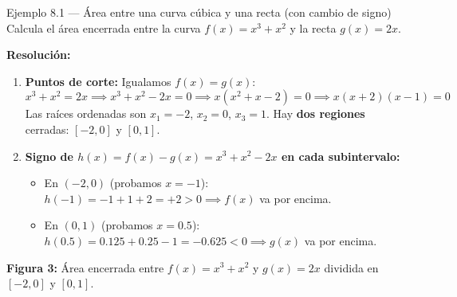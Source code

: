 \documentclass[10pt,a4paper]{article}
\begin{document}
\begin{ejemploboxlong}{Ejemplo 8.1 --- Área entre una curva cúbica y una recta (con cambio de signo)}
Calcula el área encerrada entre la curva $f(x) = x^3 + x^2$ y la recta $g(x) = 2x$.
\par\textbf{Resolución:}
\begin{enumerate}\itemsep 2pt
  \item \textbf{Puntos de corte:} Igualamos $f(x) = g(x)$:
  $$x^3 + x^2 = 2x \implies x^3 + x^2 - 2x = 0 \implies x(x^2 + x - 2) = 0 \implies x(x + 2)(x - 1) = 0$$
  Las raíces ordenadas son $x_1 = -2$, $x_2 = 0$, $x_3 = 1$. Hay \textbf{dos regiones} cerradas: $[-2, 0]$ y $[0, 1]$.
  \item \textbf{Signo de $h(x) = f(x) - g(x) = x^3 + x^2 - 2x$ en cada subintervalo:}
  \begin{itemize}\itemsep 1pt
    \item En $(-2, 0)$ (probamos $x=-1$): $h(-1) = -1 + 1 + 2 = +2 > 0 \implies f(x)$ va por encima.
    \item En $(0, 1)$ (probamos $x=0.5$): $h(0.5) = 0.125 + 0.25 - 1 = -0.625 < 0 \implies g(x)$ va por encima.
  \end{itemize}
\end{enumerate}

\begin{center}
\par\vspace{-3pt}
{\footnotesize \textbf{Figura 3:} Área encerrada entre $f(x)=x^3+x^2$ y $g(x)=2x$ dividida en $[-2, 0]$ y $[0, 1]$.}
\end{center}


\end{ejemploboxlong}
\end{document}

